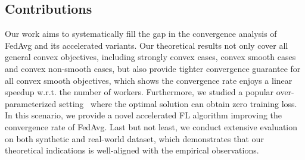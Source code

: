 \subsection{Contributions}
Our work aims to systematically fill the gap in the convergence analysis
of FedAvg and its accelerated variants. 
Our theoretical results not only cover all general convex objectives, including strongly convex cases, convex smooth cases and convex non-smooth cases, but also provide tighter convergence guarantee for all convex smooth objectives, which shows the convergence rate enjoys a linear speedup w.r.t.
the number of workers.
Furthermore, we studied a popular over-parameterized setting~\cite{liu2018accelerating} where the optimal solution can obtain zero training loss. In this scenario, we provide a novel accelerated FL algorithm improving
the convergence rate of FedAvg. Last but not least, we conduct extensive
evaluation on both synthetic and real-world dataset, which demonstrates that our theoretical indications is well-aligned with the empirical observations.



